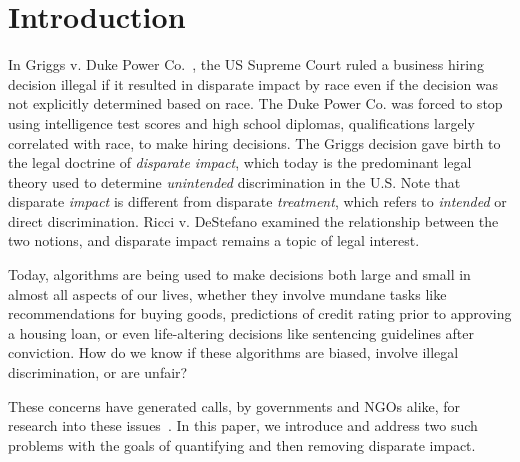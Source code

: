 \section{Introduction}

In Griggs v. Duke Power Co.~\cite{griggs1971}, the US Supreme Court ruled a business hiring decision illegal if it resulted in disparate impact by race even if the decision was not explicitly determined based on race.  The Duke Power Co. was forced to stop using intelligence test scores and high school diplomas, qualifications largely correlated with race, to make hiring decisions. The Griggs decision gave birth to the legal doctrine of \emph{disparate impact}, which today is the predominant legal theory used to determine \emph{unintended} discrimination in the U.S. Note that disparate \emph{impact} is different from disparate \emph{treatment}, which refers to \emph{intended} or direct discrimination.  Ricci v. DeStefano \cite{Ricci09} examined the relationship between the two notions, and disparate impact remains a topic of legal interest.

 Today, algorithms are being used to make decisions both large and small in almost all aspects of our lives, whether they involve mundane tasks like recommendations for buying goods, predictions of credit rating prior to approving a housing loan, or even life-altering decisions like sentencing guidelines after conviction\cite{Hodson15NewScientist}. How do we know if these algorithms are biased, involve illegal discrimination, or are unfair? 

%
These concerns have generated calls, by governments and NGOs alike, for research into these issues~\cite{podesta14bigdata, civilRightsPrinciples}.
In this paper, we introduce and address two such problems with the goals of quantifying and then removing disparate impact.

